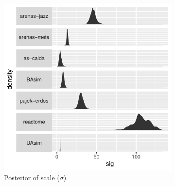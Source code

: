 \documentclass[
  10pt,
  a4paper,
]{scrreprt}
\theoremstyle{plain}
\theoremstyle{plain}
\theoremstyle{definition}
\theoremstyle{plain}
\theoremstyle{remark}
\begin{document}
{\begin{figure}
\begin{minipage}[t]{0.50\linewidth}
{\begin{figure}[H]
{\centering \includegraphics[width=1\textwidth,height=\textheight]{doc_files/figure-pdf/fig-scale-1.pdf}

}

\caption{\label{fig-scale}Posterior of scale (\(\sigma\))}

\end{figure}

}

\end{minipage}%
\newline
\begin{minipage}[t]{0.50\linewidth}

{\centering 

\begin{figure}[H]


\end{figure}}
\end{minipage}
\end{figure}}
\end{document}
